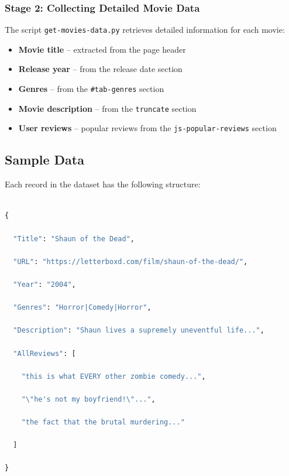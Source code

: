 \documentclass[12pt,a4paper]{article}
\begin{document}
\subsubsection{Stage 2: Collecting Detailed Movie Data}

The script \texttt{get-movies-data.py} retrieves detailed information for each movie:

\begin{itemize}

    \item \textbf{Movie title} -- extracted from the page header

    \item \textbf{Release year} -- from the release date section

    \item \textbf{Genres} -- from the \texttt{\#tab-genres} section

    \item \textbf{Movie description} -- from the \texttt{truncate} section

    \item \textbf{User reviews} -- popular reviews from the \texttt{js-popular-reviews} section

\end{itemize}

\subsection{Sample Data}

Each record in the dataset has the following structure:

\begin{lstlisting}[language=Python, basicstyle=\small]

{

  "Title": "Shaun of the Dead",

  "URL": "https://letterboxd.com/film/shaun-of-the-dead/",

  "Year": "2004",

  "Genres": "Horror|Comedy|Horror",

  "Description": "Shaun lives a supremely uneventful life...",

  "AllReviews": [

    "this is what EVERY other zombie comedy...",

    "\"he's not my boyfriend!\"...",

    "the fact that the brutal murdering..."

  ]

}

\end{lstlisting}
\end{document}
